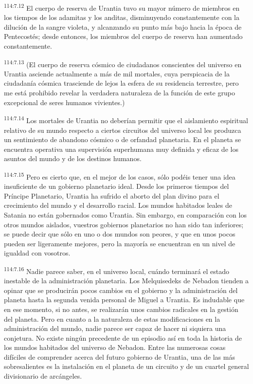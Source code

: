 \par
\textsuperscript{114:7.12} El cuerpo de reserva de Urantia tuvo su mayor número de miembros en los tiempos de los adamitas y los anditas, disminuyendo constantemente con la dilución de la sangre violeta, y alcanzando su punto más bajo hacia la época de Pentecostés; desde entonces, los miembros del cuerpo de reserva han aumentado constantemente.

\par
\textsuperscript{114:7.13} (El cuerpo de reserva cósmico de ciudadanos conscientes del universo en Urantia asciende actualmente a más de mil mortales, cuya perspicacia de la ciudadanía cósmica trasciende de lejos la esfera de su residencia terrestre, pero me está prohibido revelar la verdadera naturaleza de la función de este grupo excepcional de seres humanos vivientes.)

\par
\textsuperscript{114:7.14} Los mortales de Urantia no deberían permitir que el aislamiento espiritual relativo de su mundo respecto a ciertos circuitos del universo local les produzca un sentimiento de abandono cósmico o de orfandad planetaria. En el planeta se encuentra operativa una supervisión superhumana muy definida y eficaz de los asuntos del mundo y de los destinos humanos.

\par
\textsuperscript{114:7.15} Pero es cierto que, en el mejor de los casos, sólo podéis tener una idea insuficiente de un gobierno planetario ideal. Desde los primeros tiempos del Príncipe Planetario, Urantia ha sufrido el aborto del plan divino para el crecimiento del mundo y el desarrollo racial. Los mundos habitados leales de Satania no están gobernados como Urantia. Sin embargo, en comparación con los otros mundos aislados, vuestros gobiernos planetarios no han sido tan inferiores; se puede decir que sólo en uno o dos mundos son peores, y que en unos pocos pueden ser ligeramente mejores, pero la mayoría se encuentran en un nivel de igualdad con vosotros.

\par
\textsuperscript{114:7.16} Nadie parece saber, en el universo local, cuándo terminará el estado inestable de la administración planetaria. Los Melquisedeks de Nebadon tienden a opinar que se producirán pocos cambios en el gobierno y la administración del planeta hasta la segunda venida personal de Miguel a Urantia. Es indudable que en ese momento, si no antes, se realizarán unos cambios radicales en la gestión del planeta. Pero en cuanto a la naturaleza de estas modificaciones en la administración del mundo, nadie parece ser capaz de hacer ni siquiera una conjetura. No existe ningún precedente de un episodio así en toda la historia de los mundos habitados del universo de Nebadon. Entre las numerosas cosas difíciles de comprender acerca del futuro gobierno de Urantia, una de las más sobresalientes es la instalación en el planeta de un circuito y de un cuartel general divisionario de arcángeles.

